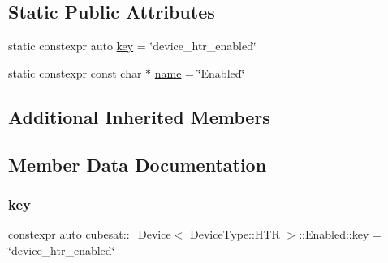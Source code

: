 \subsection*{Static Public Attributes}
\begin{DoxyCompactItemize}
\item 
static constexpr auto \hyperlink{structcubesat_1_1__Device_3_01DeviceType_1_1HTR_01_4_1_1Enabled_a41dae6507d6916467d6be7f807c92b3d}{key} = \char`\"{}device\+\_\+htr\+\_\+enabled\char`\"{}
\item 
static constexpr const char $\ast$ \hyperlink{structcubesat_1_1__Device_3_01DeviceType_1_1HTR_01_4_1_1Enabled_aac4e17cf3003e0626a1c82da570102ba}{name} = \char`\"{}Enabled\char`\"{}
\end{DoxyCompactItemize}
\subsection*{Additional Inherited Members}


\subsection{Member Data Documentation}
\mbox{\label{structcubesat_1_1__Device_3_01DeviceType_1_1HTR_01_4_1_1Enabled_a41dae6507d6916467d6be7f807c92b3d}} 
\subsubsection{\texorpdfstring{key}{key}}
{\footnotesize\ttfamily constexpr auto \hyperlink{structcubesat_1_1__Device}{cubesat\+::\+\_\+\+Device}$<$ Device\+Type\+::\+H\+TR $>$\+::Enabled\+::key = \char`\"{}device\+\_\+htr\+\_\+enabled\char`\"{}\hspace{0.3cm}{\ttfamily [static]}}

\mbox{\label{structcubesat_1_1__Device_3_01DeviceType_1_1HTR_01_4_1_1Enabled_aac4e17cf3003e0626a1c82da570102ba}} 
